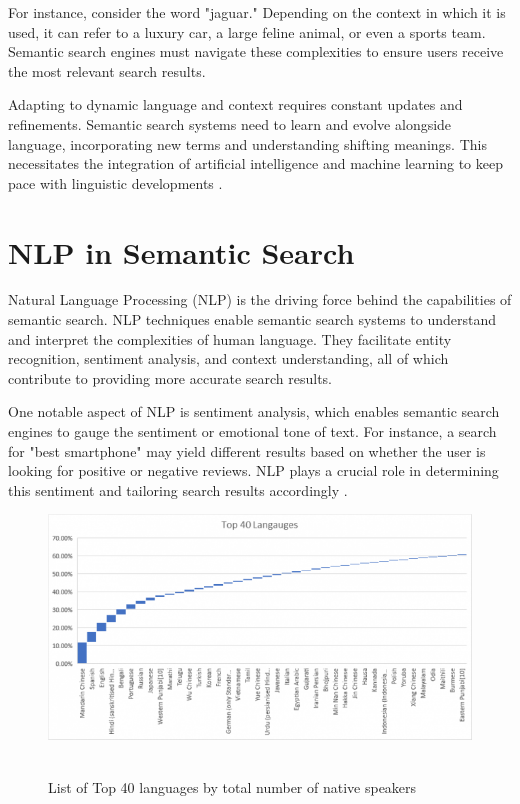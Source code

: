 \documentclass[10pt,oneside,a4paper]{article}
\begin{document}
For instance, consider the word "jaguar." Depending on the context in which it is used, it can refer to a luxury car, a large feline animal, or even a sports team. Semantic search engines must navigate these complexities to ensure users receive the most relevant search results.

Adapting to dynamic language and context requires constant updates and refinements. Semantic search systems need to learn and evolve alongside language, incorporating new terms and understanding shifting meanings. This necessitates the integration of artificial intelligence and machine learning to keep pace with linguistic developments \cite{Wilson2019}.


\section{NLP in Semantic Search}
Natural Language Processing (NLP) is the driving force behind the capabilities of semantic search. NLP techniques enable semantic search systems to understand and interpret the complexities of human language. They facilitate entity recognition, sentiment analysis, and context understanding, all of which contribute to providing more accurate search results.

One notable aspect of NLP is sentiment analysis, which enables semantic search engines to gauge the sentiment or emotional tone of text. For instance, a search for "best smartphone" may yield different results based on whether the user is looking for positive or negative reviews. NLP plays a crucial role in determining this sentiment and tailoring search results accordingly \cite{Jurafsky2020}.

\begin{figure}[h]
\centering
\includegraphics[scale=0.6]{NLP.png}\
\caption{List of Top 40 languages by total number of native speakers}
\end{figure}
\end{document}
